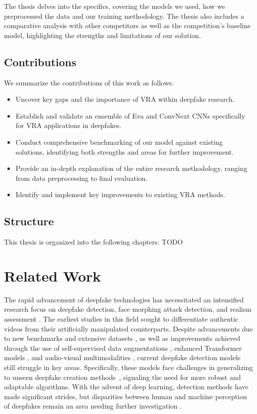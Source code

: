 \documentclass[a4paper,12pt,openright]{book}
\begin{document}
The thesis delves into the specifics, covering the models we used, how we preprocessed the data and our training methodology. The thesis also includes a comparative analysis with other competitors as well as the competition's baseline model, highlighting the strengths and limitations of our solution.

\section{Contributions}

We summarize the contributions of this work as follows:

\begin{itemize}
    \item Uncover key gaps and the importance of VRA within deepfake research.
    \item Establish and validate an ensemble of Eva and ConvNext CNNs specifically for VRA applications in deepfakes.
    \item Conduct comprehensive benchmarking of our model against existing solutions, identifying both strengths and areas for further improvement.
    \item Provide an in-depth explanation of the entire research methodology, ranging from data preprocessing to final evaluation.
    \item Identify and implement key improvements to existing VRA methods.
\end{itemize}


\section{Structure}

This thesis is organized into the following chapters:
TODO

\chapter{Related Work}
\label{ch0}
The rapid advancement of deepfake technologies has necessitated an intensified research focus on deepfake detection, face morphing attack detection, and realism assessment \cite{DBLP:journals/corr/abs-2103-00484, ivanovska2022face}. The earliest studies in this field sought to differentiate authentic videos from their artificially manipulated counterparts. Despite advancements due to new benchmarks and extensive datasets \cite{khalid2022fakeavceleb, DBLP:journals/corr/abs-2103-16076}, as well as improvements achieved through the use of self-supervised data augmentations \cite{shiohara2022detecting}, enhanced Transformer models \cite{ISTVT}, and audio-visual multimodalities \cite{AVoiD}, current deepfake detection models still struggle in key areas. Specifically, these models face challenges in generalizing to unseen deepfake creation methods~\cite{li2023generalizable}, signaling the need for more robust and adaptable algorithms.
With the advent of deep learning, detection methods have made significant strides, but disparities between human and machine perception of deepfakes remain an area needing further investigation \cite{DBLP:journals/corr/abs-2009-03155}.
\end{document}
